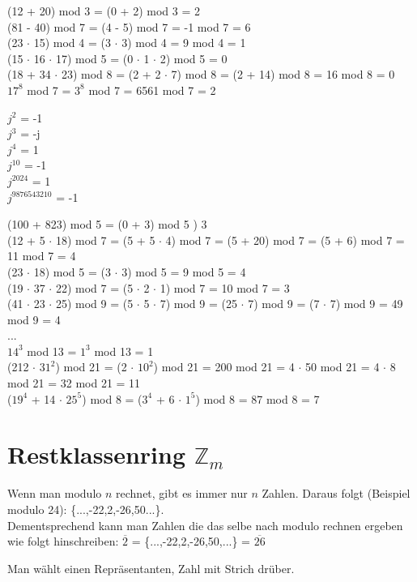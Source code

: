 	(12 + 20) mod 3 = (0 + 2) mod 3 = 2 \\
	(81 - 40) mod 7 = (4 - 5) mod 7 = -1 mod 7 = 6 \\
	(23 $\cdot$ 15) mod 4 = (3 $\cdot$ 3) mod 4 = 9 mod 4 = 1 \\
	(15 $\cdot$ 16 $\cdot$ 17) mod 5 = (0 $\cdot$ 1 $\cdot$ 2) mod 5 = 0 \\
	(18 + 34 $\cdot$ 23) mod 8 = (2 + 2 $\cdot$ 7) mod 8 = (2 + 14) mod 8 = 16 mod 8 = 0 \\
	$17^8$ mod 7 = $3^8$ mod 7 = 6561 mod 7 = 2 
	
	$j^{2}$ = -1 \\
	$j^{3}$ = -j \\
	$j^{4}$ = 1 \\
	$j^{10}$ = -1 \\
	$j^{2024}$ = 1 \\
	$j^{9876543210}$ = -1
	
	(100 + 823) mod 5 = (0 + 3) mod 5 ) 3 \\
	(12 + 5 $\cdot$ 18) mod 7 = (5 + 5 $\cdot$ 4) mod 7 = (5 + 20) mod 7 = (5 + 6) mod 7 = 11 mod 7 = 4 \\
	(23 $\cdot$ 18) mod 5 = (3 $\cdot$ 3) mod 5 = 9 mod 5 = 4 \\
	(19 $\cdot$ 37 $\cdot$ 22) mod 7 = (5 $\cdot$ 2 $\cdot$ 1) mod 7 = 10 mod 7 = 3 \\
	(41 $\cdot$ 23 $\cdot$ 25) mod 9 = (5 $\cdot$ 5 $\cdot$ 7) mod 9 = (25 $\cdot$ 7) mod 9 = (7 $\cdot$ 7) mod 9 = 49 mod 9 = 4 \\
	... \\
	$14^3$ mod 13 = $1^3$ mod 13 = 1 \\
	(212 $\cdot$ $31^2$) mod 21 = (2 $\cdot$ $10^2$) mod 21 = 200 mod 21 = 4 $\cdot$ 50 mod 21 = 4 $\cdot$ 8 mod 21 = 32 mod 21 = 11 \\
	($19^4$ + 14 $\cdot$ $25^5$) mod 8 = ($3^4$ + 6 $\cdot$ $1^5$) mod 8 = 87 mod 8 = 7
\section{Restklassenring $\mathbb{Z}_m$}
Wenn man modulo $n$ rechnet, gibt es immer nur $n$ Zahlen. Daraus folgt (Beispiel modulo 24): \{...,-22,2,-26,50...\}. \\
Dementsprechend kann man Zahlen die das selbe nach modulo rechnen ergeben wie folgt hinschreiben:
$\overline{\text{2}}$ = \{...,-22,2,-26,50,...\} = $\overline{\text{26}}$

Man wählt einen Repräsentanten, Zahl mit Strich drüber.

